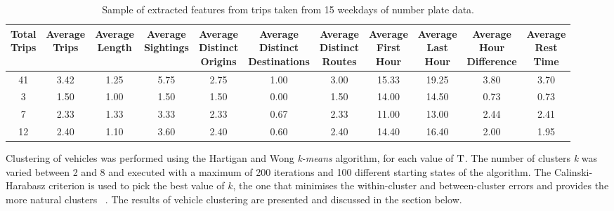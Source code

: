 \begin{table*}[t]
\centering
\begin{tabular}{c c c c c c c c c c c}
  \hline
 \thead{Total\\Trips} & \thead{Average\\Trips} & \thead{Average\\Length} & \thead{Average\\Sightings} & \thead{Average\\Distinct\\Origins} & \thead{Average\\Distinct\\Destinations} & \thead{Average\\Distinct\\Routes} & \thead{Average\\First\\Hour} & \thead{Average\\Last\\Hour} & \thead{Average\\Hour\\Difference} & \thead{Average\\Rest\\Time} \\
  \hline
41 & 3.42 & 1.25 & 5.75 & 2.75 & 1.00 & 3.00 & 15.33 & 19.25 & 3.80 & 3.70 \\
3 & 1.50 & 1.00 & 1.50 & 1.50 & 0.00 & 1.50 & 14.00 & 14.50 & 0.73 & 0.73 \\
7 & 2.33 & 1.33 & 3.33 & 2.33 & 0.67 & 2.33 & 11.00 & 13.00 & 2.44 & 2.41 \\
12 & 2.40 & 1.10 & 3.60 & 2.40 & 0.60 & 2.40 & 14.40 & 16.40 & 2.00 & 1.95 \\
   \hline
\end{tabular}
\caption{Sample of extracted features from trips taken from 15 weekdays of number plate data.}
\vspace{-0.2cm}
\label{t:features}
\end{table*}

Clustering of vehicles was performed using the Hartigan and Wong \emph{k-means} algorithm, for each value of $\mathrm{T}$. The number of clusters \emph{k} was varied between 2 and 8 and executed with a maximum of 200 iterations and 100 different starting states of the algorithm. The Calinski-Harabasz criterion is used to pick the best value of $k$, the one that minimises the within-cluster and between-cluster errors and provides the more natural clusters ~\cite{Kmeans}. The results of vehicle clustering are presented and discussed in the section below.


